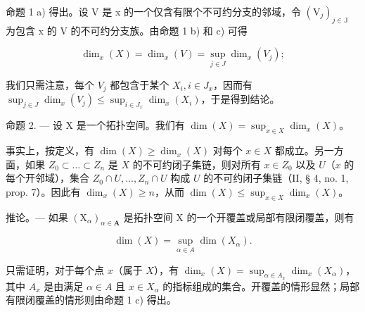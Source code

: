 命题 1 a) 得出。设 V 是 x 的一个仅含有限个不可约分支的邻域，令 \((\mathrm{V}_{j})_{j\in\mathbb{J}}\) 为包含 x 的 V 的不可约分支族。由命题 1 b) 和 c) 可得

\[
\dim_ {x} (X) = \dim_ {x} (V) = \sup _ {j \in J} \dim_ {x} (V _ {j});
\]

我们只需注意，每个 \(V_{j}\) 都包含于某个 \(X_{i}, i \in J_{x}\)，因而有 \(\sup_{j \in J} \dim_{x}(V_{j}) \leqslant \sup_{i \in J_{x}} \dim_{x}(X_{i})\)，于是得到结论。

命题 2. — 设 X 是一个拓扑空间。我们有 \(\dim(X) = \sup_{x \in X} \dim_x(X)\)。

事实上，按定义，有 \(\dim(X) \geqslant \dim_x(X)\) 对每个 \(x \in X\) 都成立。另一方面，如果 \(Z_0 \subset \ldots \subset Z_n\) 是 \(X\) 的不可约闭子集链，则对所有 \(x \in Z_0\) 以及 \(U\)（\(x\) 的每个开邻域），集合 \(Z_0 \cap U, \ldots, Z_n \cap U\) 构成 \(U\) 的不可约闭子集链（II, § 4, no. 1, prop. 7）。因此有 \(\dim_x(X) \geqslant n\)，从而 \(\dim(X) \leqslant \sup_{x \in X} \dim_x(X)\)。

推论。— 如果 \((\mathrm{X}_{\alpha})_{\alpha\in\mathbf{A}}\) 是拓扑空间 X 的一个开覆盖或局部有限闭覆盖，则有

\[
\dim (X) = \sup _ {\alpha \in A} \dim (X _ {\alpha}).
\]

只需证明，对于每个点 \(x\)（属于 \(X\)），有 \(\dim_x(X) = \sup_{\alpha \in A_x} \dim_x(X_\alpha)\)，其中 \(A_x\) 是由满足 \(\alpha \in A\) 且 \(x \in X_\alpha\) 的指标组成的集合。开覆盖的情形显然；局部有限闭覆盖的情形则由命题 1 c) 得出。

